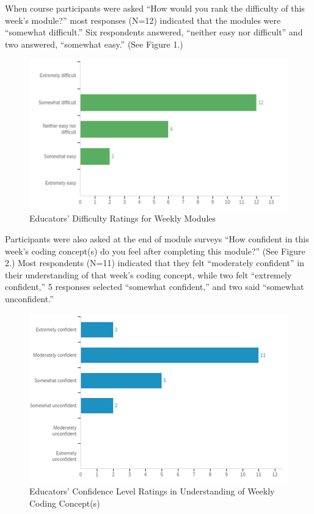 \documentclass[11.5pt]{sig-alternate} %
\begin{document}
\begin{large}
When course participants were asked “How would you rank the difficulty of this week’s module?” most responses (N=12) indicated that the modules were “somewhat difficult.” Six respondents answered, “neither easy nor difficult” and two answered, “somewhat easy.” (See Figure 1.)

\begin{figure}[th]
    \includegraphics[width=\linewidth]{images/fig1.png}
    \caption{Educators’ Difficulty Ratings for Weekly Modules}
    \label{Figure 1}
\end{figure}

Participants were also asked at the end of module surveys “How confident in this week’s coding concept(s) do you feel after completing this module?” (See Figure 2.) Most respondents (N=11) indicated that they felt “moderately confident” in their understanding of that week’s coding concept, while two  felt “extremely confident,” 5 responses selected “somewhat confident,” and two said “somewhat unconfident.”

\begin{figure}[th]
    \includegraphics[width=\linewidth]{images/fig2.png}
    \caption{Educators’ Confidence Level Ratings in Understanding of Weekly Coding Concept(s)}
    \label{Figure 2}
\end{figure}


\end{large}
\end{document}
